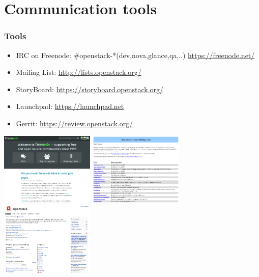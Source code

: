 \documentclass[aspectratio=169,11pt,hyperref={colorlinks=true}]{beamer}
\begin{document}
\section{Communication tools}
\begin{frame}
  \frametitle{Tools}
  \begin{itemize}
    \item IRC on Freenode: \#openstack-*(dev,nova,glance,qa,..) \url{https://freenode.net/}
    \item Mailing List: \url{http://lists.openstack.org/}
    \item StoryBoard: \url{https://storyboard.openstack.org/}
    \item Launchpad: \url{https://launchpad.net}
    \item Gerrit: \url{https://review.openstack.org/}
  \end{itemize}
  \centering
  \includegraphics[height=35mm]{images/freenode.png}
  \includegraphics[height=35mm]{images/openstack-ml.png}
  \includegraphics[height=35mm]{images/openstack-in-launchpad.png}
\end{frame}
\end{document}

